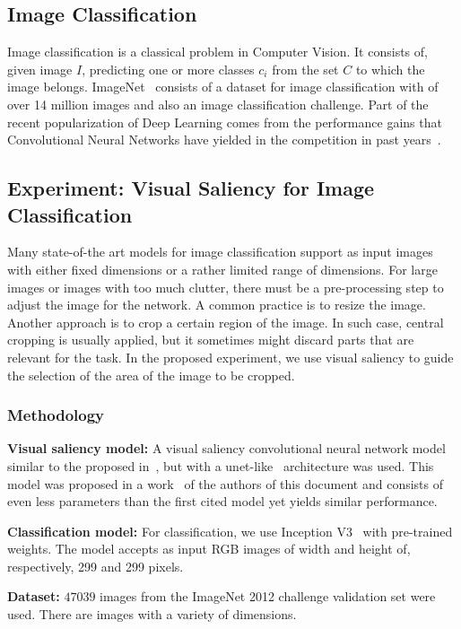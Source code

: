 \documentclass[12pt]{article}
\begin{document}
\subsection{Image Classification}
Image classification is a classical problem in Computer Vision.
It consists of, given image $I$, predicting one or more classes
$c_i$ from the set $C$ to which the image belongs.
ImageNet~\cite{ref:imagenet-dset} consists of a dataset for image classification with of over 14 million images
and also an image classification challenge.
Part of the recent popularization of Deep Learning comes from the performance gains that
Convolutional Neural Networks have yielded in the competition
in past years~\cite{ref:imagenet}\cite{ref:inceptionv3}.

\subsection{Experiment: Visual Saliency for Image Classification}
Many state-of-the art models for image classification support as input images with either fixed dimensions
or a rather limited range of dimensions.
For large images or images with too much clutter, there must be a pre-processing step to
adjust the image for the network.
A common practice is to resize the image.
Another approach is to crop a certain region of the image.
In such case, central cropping is usually applied, but it sometimes might discard parts that
are relevant for the task.
In the proposed experiment, we use visual saliency to guide the selection of the area of the image to
be cropped.

\subsubsection{Methodology}

\textbf{Visual saliency model:}
A visual saliency convolutional neural network model similar to the proposed in~\cite{ref:erik-esther},
but with a unet-like~\cite{ref:unet} architecture was used.
This model was proposed in a work~\cite{ref:ic-erik} of the authors of this document
and consists of even less parameters than the first cited model yet yields similar performance.

\textbf{Classification model:}
For classification, we use Inception V3~\cite{ref:inceptionv3} with pre-trained weights.
The model accepts as input RGB images of width and height of, respectively, 299 and 299 pixels.

\textbf{Dataset:}
$47039$ images from the ImageNet 2012 challenge validation set were used.
There are images with a variety of dimensions.
\end{document}

